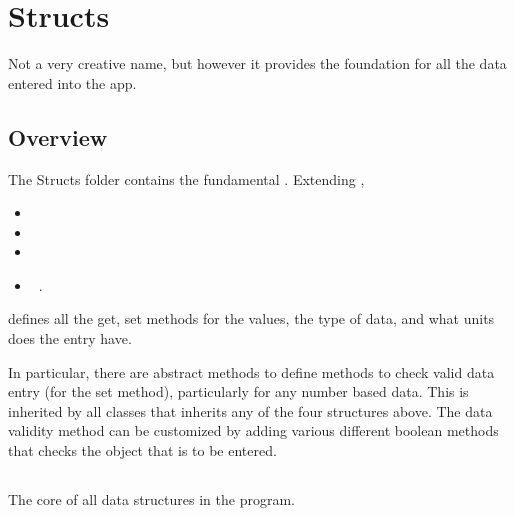 \documentclass[../Documentation.tex]{subfiles}
\begin{document}
\section{Structs}
Not a very creative name, but however it provides the foundation for all the data entered into the app.
\subsection{Overview}
The Structs folder contains the fundamental . 
Extending ,
\begin{itemize}
	\item {}
	\item {}
	\item {}
	\item {}\ .
\end{itemize}
 defines all the get, set methods for the values, the type of data, and what units does the entry have. 

In particular, there are abstract methods to define methods to check valid data entry (for the set method), particularly for any number based data. This is inherited by all classes that inherits any of the four structures above. The data validity method can be customized by adding various different boolean methods that checks the object that is to be entered.

\subsection{}
The core of all data structures in the program. 
\begin{comment}
\begin{itemize} 
	\object{Struct\_Entry}{Object} Holds all the values of the data.
	\object{Struct\_Type}{String} What is the characteristic that describes the object. E.g. Weight, Height, etc.
	\object{Struct\_Units}{String} The units of the type.
	\object{Struct\_Lock}{Boolean} Locks the type and units of the data from modification.
	\item[] \\
	\constructor{Struct}{
\end{itemize}
\end{comment}
\end{document}
